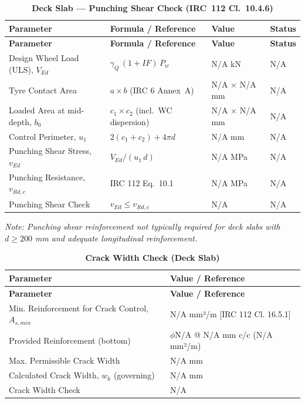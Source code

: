 \documentclass[12pt,a4paper]{report}
\numberwithin{table}{chapter}
\numberwithin{figure}{chapter}
\newcommand{\ReportTableSetup}{%
  \setlength{\tabcolsep}{3.0pt}%
  \renewcommand{\arraystretch}{1.18}%
  \setlength{\arrayrulewidth}{0.4pt}\setlength{\extrarowheight}{0.5pt}%
  \setlength{\LTleft}{\fill}\setlength{\LTright}{\fill}%
  \setlength{\LTpre}{4pt}\setlength{\LTpost}{8pt}}
\newcommand{\ReportTableFont}{\small}
\newcommand{\ReportRowGap}{3.0pt}
\newcommand{\ReportTableGap}{\vspace{0.5em}}
\begin{document}
\ReportTableGap
\begingroup
\ReportTableSetup
\ReportTableFont
\begin{longtable}{|L{5.5000cm}|C{3.5000cm}|>{\centering\arraybackslash}p{4.5000cm}|C{2.0000cm}|}
\caption{\textbf{Deck Slab --- Punching Shear Check (IRC~112 Cl.~10.4.6)}}\\
\hline
\textbf{Parameter} & \textbf{Formula / Reference} & \textbf{Value} & \textbf{Status} \\[\ReportRowGap]
\hline
\endfirsthead
\hline
\textbf{Parameter} & \textbf{Formula / Reference} & \textbf{Value} & \textbf{Status} \\[\ReportRowGap]
\hline
\endhead
\hline
\endfoot
\hline
\endlastfoot

Design Wheel Load (ULS), $V_{Ed}$ & $\gamma_Q\,(1+IF)\,P_w$ & N/A kN & N/A \\[\ReportRowGap]
\hline
Tyre Contact Area & $a \times b$ (IRC 6 Annex~A) & N/A $\times$ N/A mm & N/A \\[\ReportRowGap]
\hline
Loaded Area at mid-depth, $b_0$ & $c_1 \times c_2$ (incl.\ WC dispersion) & N/A $\times$ N/A mm & N/A \\[\ReportRowGap]
\hline
Control Perimeter, $u_1$ & $2(c_1+c_2) + 4\pi d$ & N/A mm & N/A \\[\ReportRowGap]
\hline
Punching Shear Stress, $v_{Ed}$ & $V_{Ed} / (u_1\,d)$ & N/A MPa & N/A \\[\ReportRowGap]
\hline
Punching Resistance, $v_{Rd,c}$ & IRC 112 Eq.\ 10.1 & N/A MPa & N/A \\[\ReportRowGap]
\hline
Punching Shear Check & $v_{Ed} \leq v_{Rd,c}$ & N/A & N/A \\[\ReportRowGap]
\hline
\end{longtable}
\endgroup
\noindent\textit{Note: Punching shear reinforcement not typically required for deck slabs with $d \geq 200$ mm and adequate longitudinal reinforcement.}

\ReportTableGap
\begingroup
\ReportTableSetup
\ReportTableFont
\begin{longtable}{|L{7.0000cm}|>{\arraybackslash}p{8.5000cm}|}
\caption{\textbf{Crack Width Check (Deck Slab)}}\\
\hline
\textbf{Parameter} & \textbf{Value / Reference} \\[\ReportRowGap]
\hline
\endfirsthead
\hline
\textbf{Parameter} & \textbf{Value / Reference} \\[\ReportRowGap]
\hline
\endhead
\hline
\endfoot
\hline
\endlastfoot

\textnormal{Min. Reinforcement for Crack Control, $A_{s,min}$} & N/A mm²/m [IRC 112 Cl. 16.5.1] \\[\ReportRowGap]
\hline
\textnormal{Provided Reinforcement (bottom)} & $\phi$N/A @ N/A mm c/c (N/A mm²/m) \\[\ReportRowGap]
\hline
\textnormal{Max. Permissible Crack Width} & N/A mm \\[\ReportRowGap]
\hline
\textnormal{Calculated Crack Width, $w_k$ (governing)} & N/A mm \\[\ReportRowGap]
\hline
\textnormal{Crack Width Check} & N/A \\[\ReportRowGap]
\hline
\end{longtable}
\endgroup
\end{document}
